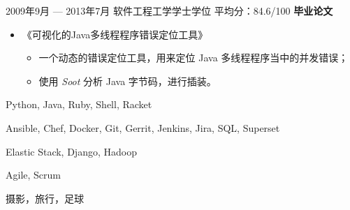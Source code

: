 \documentclass{newresume}
\begin{document}
\begin{body}
\begin{itemize}
	\end{itemize}

	\smallskip
	{2009年9月 --- 2013年7月}
	{软件工程工学学士学位}
	{平均分：84.6/100}
	\textbf{毕业论文}
	\begin{itemize}
	\item 《可视化的Java多线程程序错误定位工具》
	\begin{itemize}
		\item 一个动态的错误定位工具，用来定位 Java 多线程程序当中的并发错误；
		\item 使用 \textit{Soot} 分析 Java 字节码，进行插装。
	\end{itemize}
	\end{itemize}
\end{body}

\smallskip


\begin{description}[style=nextline,leftmargin=3em,topsep=1pt]
	\item[语言] Python, Java, Ruby, Shell, Racket
	\item[工具] Ansible, Chef, Docker, Git, Gerrit, Jenkins, Jira, SQL, Superset
	\item[框架] Elastic Stack, Django, Hadoop
	\item[方法] Agile, Scrum
\end{description}





%




\begin{body}
	摄影，旅行，足球
\end{body}
\end{document}
